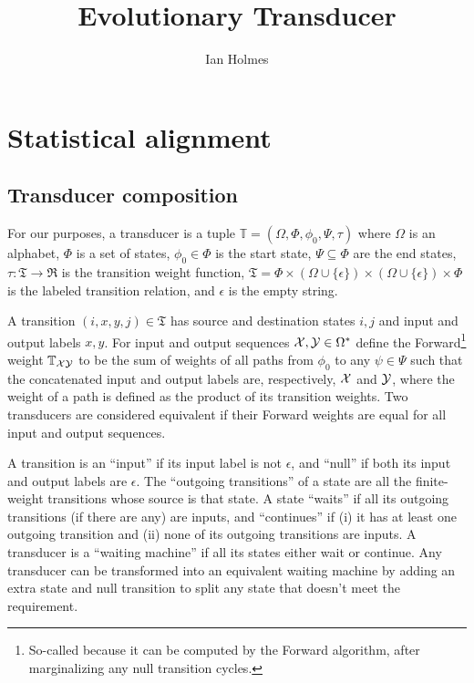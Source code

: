 \documentclass{article}
\title{Evolutionary Transducer}
\author{Ian Holmes}
\begin{document}

\section{Statistical alignment}

\subsection{Transducer composition}

\newcommand\gappedalphabet{(\Omega \cup \{\epsilon\})}

For our purposes, a transducer is a tuple
$\mathbb{T} = (\Omega, \Phi, \phi_0, \Psi, \tau)$
where
$\Omega$ is an alphabet,
$\Phi$ is a set of states,
$\phi_0 \in \Phi$ is the start state,
$\Psi \subseteq \Phi$ are the end states, 
$\tau:\mathfrak{T} \to \Re$ is the transition weight function,
$\mathfrak{T} = \Phi \times \gappedalphabet \times \gappedalphabet \times \Phi$ is the labeled transition relation,
and $\epsilon$ is the empty string.

A transition $(i,x,y,j) \in \mathfrak{T}$ has source and destination states $i,j$ and input and output labels $x,y$.
For input and output sequences ${\cal X}, {\cal Y} \in \Omega^\ast$
define the Forward\footnote{So-called because it can be computed by the Forward algorithm, after marginalizing any null transition cycles.} weight
$\mathbb{T}_{\cal XY}$ to be the sum of weights of all paths from $\phi_0$ to any $\psi \in \Psi$
such that the concatenated input and output labels are, respectively, ${\cal X}$ and ${\cal Y}$, where the weight of a path is defined as the product of its transition weights.
Two transducers are considered equivalent if their Forward weights are equal for all input and output sequences.

A transition is an ``input'' if its input label is not $\epsilon$, and ``null'' if both its input and output labels are $\epsilon$.
The ``outgoing transitions'' of a state are all the finite-weight transitions whose source is that state.
A state ``waits'' if all its outgoing transitions (if there are any) are inputs,
and ``continues'' if (i) it has at least one outgoing transition and (ii) none of its outgoing transitions are inputs.
A transducer is a ``waiting machine'' if all its states either wait or continue.
Any transducer can be transformed into an equivalent waiting machine by adding an extra state and null transition to split any state
that doesn't meet the requirement.
\end{document}
